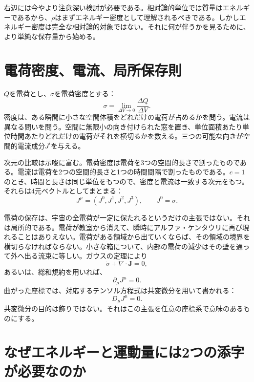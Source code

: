 右辺には今やより注意深い検討が必要である。相対論的単位では質量はエネルギーであるから、\(\rho\)はまずエネルギー密度として理解されるべきである。しかしエネルギー密度は完全な相対論的対象ではない。それに何が伴うかを見るために、より単純な保存量から始める。

\section{電荷密度、電流、局所保存則}

\(Q\)を電荷とし、\(\sigma\)を電荷密度とする：
\begin{equation}
 \sigma=\lim_{\Delta V\to0}\frac{\Delta Q}{\Delta V}.
\end{equation}
密度は、ある瞬間に小さな空間体積をどれだけの電荷が占めるかを問う。電流は異なる問いを問う。空間に無限小の向き付けられた窓を置き、単位面積あたり単位時間あたりどれだけの電荷がそれを横切るかを数える。三つの可能な向きが空間的電流成分\(J^i\)を与える。

次元の比較は示唆に富む。電荷密度は電荷を3つの空間的長さで割ったものである。電流は電荷を2つの空間的長さと1つの時間間隔で割ったものである。\(c=1\)のとき、時間と長さは同じ単位をもつので、密度と電流は一致する次元をもつ。それらは4元ベクトルとしてまとまる：
\begin{equation}
 J^\mu=(J^0,J^1,J^2,J^3),
 \qquad J^0=\sigma.
\end{equation}

電荷の保存は、宇宙の全電荷が一定に保たれるというだけの主張ではない。それは局所的である。電荷が教室から消えて、瞬時にアルファ・ケンタウリに再び現れることはありえない。電荷がある領域から出ていくならば、その領域の境界を横切らなければならない。小さな箱について、内部の電荷の減少はその壁を通って外へ出る流束に等しい。ガウスの定理により
\begin{equation}
 \dot{\sigma}+\nabla\cdot\mathbf{J}=0,
\end{equation}
あるいは、総和規約を用いれば、
\begin{equation}
 \partial_\mu J^\mu=0.
 \label{eq:charge-continuity}
\end{equation}
曲がった座標では、対応するテンソル方程式は共変微分を用いて書かれる：
\begin{equation}
 D_\mu J^\mu=0.
\end{equation}
共変微分の目的は飾りではない。それはこの主張を任意の座標系で意味のあるものにする。

\section{なぜエネルギーと運動量には2つの添字が必要なのか}

